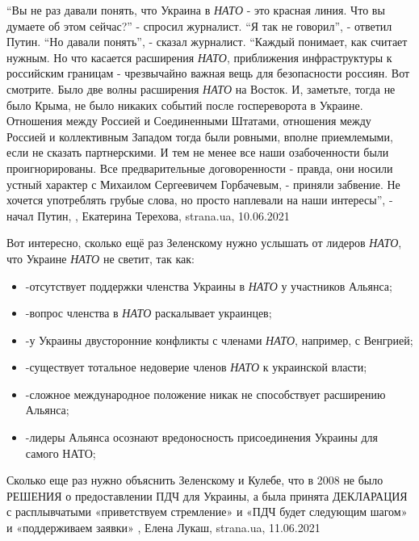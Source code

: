 \enquote{Вы не раз давали понять, что Украина в \emph{НАТО} - это красная линия. Что вы думаете об этом сейчас?} - спросил журналист. 
\enquote{Я так не говорил}, - ответил Путин. 
\enquote{Но давали понять}, - сказал журналист. 
\enquote{Каждый понимает, как считает нужным. Но что касается расширения \emph{НАТО},
приближения инфраструктуры к российским границам - чрезвычайно важная вещь для
безопасности россиян. Вот смотрите. Было две волны расширения \emph{НАТО} на Восток.
И, заметьте, тогда не было Крыма, не было никаких событий после госпереворота в
Украине. Отношения между Россией и Соединенными Штатами, отношения между
Россией и коллективным Западом тогда были ровными, вполне приемлемыми, если не
сказать партнерскими. И тем не менее все наши озабоченности были
проигнорированы. Все предварительные договоренности - правда, они носили устный
характер с Михаилом Сергеевичем Горбачевым, - приняли забвение. Не хочется
употреблять грубые слова, но просто наплевали на наши интересы}, - начал Путин,
, 
Екатерина Терехова, strana.ua, 10.06.2021

Вот интересно, сколько ещё раз Зеленскому нужно услышать от лидеров \emph{НАТО}, что Украине \emph{НАТО} не светит, так как:

\begin{itemize}
\item -отсутствует поддержки членства Украины в \emph{НАТО} у участников Альянса;
\item -вопрос членства в \emph{НАТО} раскалывает украинцев;
\item -у Украины двусторонние конфликты с членами \emph{НАТО}, например, с Венгрией;
\item -существует тотальное недоверие членов \emph{НАТО} к украинской власти;
\item -сложное международное положение никак не способствует расширению Альянса;
\item -лидеры Альянса осознают вредоносность присоединения Украины для самого НАТО;
\end{itemize}

Сколько еще раз нужно объяснить Зеленскому и Кулебе, что в 2008 не было РЕШЕНИЯ
о предоставлении ПДЧ для Украины, а была принята ДЕКЛАРАЦИЯ с расплывчатыми
«приветствуем стремление» и «ПДЧ будет следующим шагом» и «поддерживаем заявки» 
, Елена Лукаш, strana.ua, 11.06.2021

